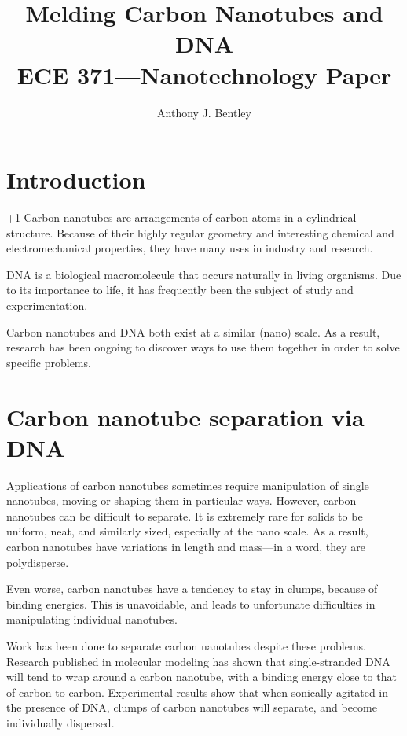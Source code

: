 \documentclass[12pt]{article}
\begin{document}
\linespread{1.5}

\author{Anthony J. Bentley}
\title{Melding Carbon Nanotubes and DNA\\
ECE 371---Nanotechnology Paper}
\maketitle

\newpage

\tableofcontents

\newpage

\section*{Introduction}

\looseness +1 Carbon nanotubes are arrangements of carbon atoms in a cylindrical structure. Because of their highly regular geometry and interesting chemical and electromechanical properties, they have many uses in industry and research.

DNA is a biological macromolecule that occurs naturally in living organisms. Due to its importance to life, it has frequently been the subject of study and experimentation.

Carbon nanotubes and DNA both exist at a similar (nano) scale. As a result, research has been ongoing to discover ways to use them together in order to solve specific problems.

\section{Carbon nanotube separation via DNA}

Applications of carbon nanotubes sometimes require manipulation of single nanotubes, moving or shaping them in particular ways. However, carbon nanotubes can be difficult to separate. It is extremely rare for solids to be uniform, neat, and similarly sized, especially at the nano scale. As a result, carbon nanotubes have variations in length and mass---in a word, they are polydisperse.

Even worse, carbon nanotubes have a tendency to stay in clumps, because of binding energies. This is unavoidable, and leads to unfortunate difficulties in manipulating individual nanotubes.

Work has been done to separate carbon nanotubes despite these problems. Research published in molecular modeling has shown that single-stranded DNA will tend to wrap around a carbon nanotube, with a binding energy close to that of carbon to carbon. Experimental results show that when sonically agitated in the presence of DNA, clumps of carbon nanotubes will separate, and become individually dispersed.\cite{zheng03}
\end{document}
